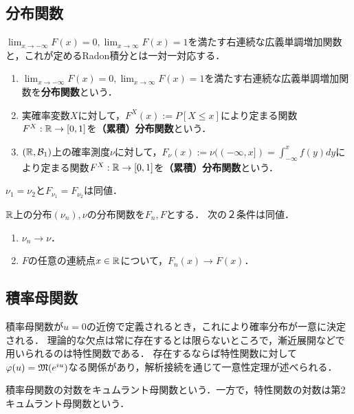 \documentclass[uplatex,dvipdfmx]{jsreport}
\begin{document}
\subsection{分布関数}

\begin{tcolorbox}[colframe=ForestGreen, colback=ForestGreen!10!white,breakable,colbacktitle=ForestGreen!40!white,coltitle=black,fonttitle=\bfseries\sffamily,
title=]
$\lim_{x\to-\infty}F(x)=0,\lim_{x\to\infty}F(x)=1$を満たす右連続な広義単調増加関数と，これが定めるRadon積分とは一対一対応する．
\end{tcolorbox}

\begin{definition}\mbox{}
    \begin{enumerate}
        \item $\lim_{x\to-\infty}F(x)=0,\lim_{x\to\infty}F(x)=1$を満たす右連続な広義単調増加関数を\textbf{分布関数}という．
        \item 実確率変数$X$に対して，$F^X(x):=P[X\le x]$により定まる関数$F^X:\mathbb{R}\to[0,1]$を\textbf{（累積）分布関数}という．
        \item $(\mathbb{R},\mathcal{B}_1)$上の確率測度$\nu$に対して，$F_\nu(x):=\nu((-\infty,x])=\int^x_{-\infty}f(y)dy$により定まる関数$F^X:\mathbb{R}\to[0,1]$を\textbf{（累積）分布関数}という．
    \end{enumerate}
\end{definition}

\begin{proposition}[一意性定理]
    $\nu_1=\nu_2$と$F_{\nu_1}=F_{\nu_2}$は同値．
\end{proposition}

\begin{proposition}
    $\mathbb{R}$上の分布$(\nu_n),\nu$の分布関数を$F_n,F$とする．
    次の２条件は同値．
    \begin{enumerate}
        \item $\nu_n\to\nu$．
        \item $F$の任意の連続点$x\in\mathbb{R}$について，$F_n(x)\to F(x)$．
    \end{enumerate}
\end{proposition}

\subsection{積率母関数}

\begin{tcolorbox}[colframe=ForestGreen, colback=ForestGreen!10!white,breakable,colbacktitle=ForestGreen!40!white,coltitle=black,fonttitle=\bfseries\sffamily,
title=]
    積率母関数が$u=0$の近傍で定義されるとき，これにより確率分布が一意に決定される．
    理論的な欠点は常に存在するとは限らないところで，漸近展開などで用いられるのは特性関数である．
    存在するならば特性関数に対して$\varphi(u)=\mathfrak{M}(e^{iu})$なる関係があり，解析接続を通じて一意性定理が述べられる．

    積率母関数の対数をキュムラント母関数という．一方で，特性関数の対数は第2キュムラント母関数という．
\end{tcolorbox}
\end{document}
